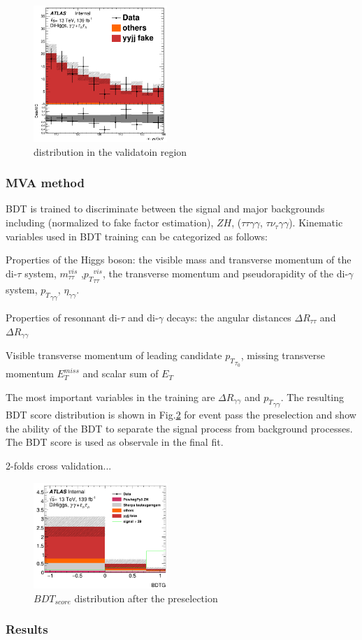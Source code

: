 \begin{figure}
	\centering
	\includegraphics[width=0.45\textwidth]{figures/yy2tau/m_yy_VR_2taus_invertGam1.png}
	\caption{\label{fig:yy2tau:VRs} \myy distribution in the validatoin region}
\end{figure}

\subsubsection{MVA method}

BDT is trained to discriminate between the \yytwotau signal and major backgrounds including \yyjet (normalized to fake factor estimation), $ZH$, \Vyy ($\tau\tau\gamma\gamma$, $\tau\nu_{\tau}\gamma\gamma$). Kinematic variables used in BDT training can be categorized as follows:

Properties of the Higgs boson: the visible mass and transverse momentum of the di-$\tau$ system, ${m^{vis}_{\tau\tau}}$ ,${p_{T}}^{vis}_{\tau\tau}$, the transverse momentum and pseudorapidity of the di-$\gamma$ system, ${p_{T}}_{\gamma\gamma}$, $\eta_{\gamma\gamma}$.

Properties of resonnant di-$\tau$ and di-$\gamma$ decays: the angular distances $\Delta R_{\tau\tau}$ and $\Delta R_{\gamma\gamma}$

Visible transverse momentum of leading \tauh candidate ${p_{T}}_{\tau_{0}}$, missing transverse momentum $E^{miss}_{T}$ and scalar sum of $E_{T}$

The most important variables in the training are $\Delta R_{\gamma\gamma}$ and ${p_{T}}_{\gamma\gamma}$. The resulting BDT score distribution is shown in Fig.\ref{fig:yy2tau:BDT} for event pass the preselection and show the ability of the BDT to separate the signal process from background processes. The BDT score is used as observale in the final fit.

2-folds cross validation...

\begin{figure}
	\centering
	\includegraphics[width=0.45\textwidth]{figures/yy2tau/BDT.png}
	\caption{\label{fig:yy2tau:BDT} $BDT_{score}$ distribution after the preselection}
\end{figure}

\subsubsection{Results}
